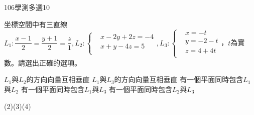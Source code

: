     \begin{QUESTION}
        \begin{ExamInfo}{106}{學測}{多選}{10}
        \end{ExamInfo}
        \begin{ExamAnsRateInfo}{43}{66}{39}{24}
        \end{ExamAnsRateInfo}
        \begin{QBODY}
            坐標空間中有三直線${{L}_{1}}:\dfrac{x-1}{2}=\dfrac{y+1}{2}=\dfrac{z}{1},{{L}_{2}}:\left\{ \begin{aligned}
			& x-2y+2z=-4 \\ 
			& x+y-4z=5 \\ 
			\end{aligned} \right.,{{L}_{3}}:\left\{ \begin{aligned}
			& x=-t \\ 
			& y=-2-t \\ 
			& z=4+4t \\ 
			\end{aligned} \right.$，$t$為實數。請選出正確的選項。
			\begin{QOPS}
				\QOP ${{L}_{1}}$與${{L}_{2}}$的方向向量互相垂直
				\QOP ${{L}_{1}}$與${{L}_{3}}$的方向向量互相垂直
				\QOP 有一個平面同時包含${{L}_{1}}$與${{L}_{2}}$
				\QOP 有一個平面同時包含${{L}_{1}}$與${{L}_{3}}$
				\QOP 有一個平面同時包含${{L}_{2}}$與${{L}_{3}}$
			\end{QOPS}
        \end{QBODY}
        \begin{QFROMS}
        \end{QFROMS}
        \begin{QTAGS}\end{QTAGS}
        \begin{QANS}
            (2)(3)(4)
        \end{QANS}
        \begin{QSOLLIST}
        \end{QSOLLIST}
        \begin{QEMPTYSPACE}
        \end{QEMPTYSPACE}
    \end{QUESTION}

